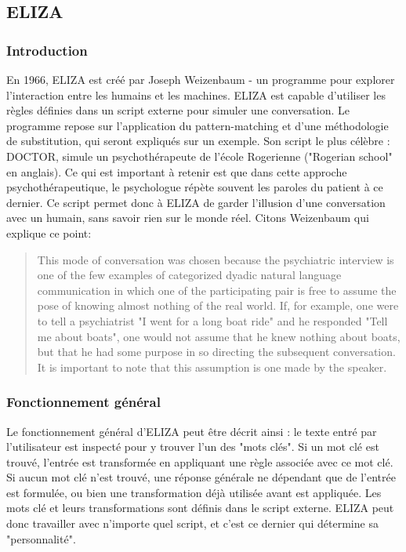 \documentclass[11pt, a4paper]{report}
\begin{document}
    \subsection{ELIZA}
    \cite{wikipedia-eliza}
    \cite{eliza-original}
    \cite{eliza-gpt}
    \cite{weizenbaum-book}
    \cite{weizenbaum-pic}
      \subsubsection{Introduction}
En 1966, ELIZA est créé par Joseph Weizenbaum - un programme pour explorer l'interaction entre les humains et 
les machines. ELIZA est capable d'utiliser les règles définies dans un script externe pour 
simuler une conversation. Le programme repose sur l'application du pattern-matching et d'une 
méthodologie de substitution, qui seront expliqués sur un exemple.
Son script le plus célèbre : DOCTOR, simule un psychothérapeute de l'école Rogerienne
("Rogerian school" en anglais). Ce qui est important à retenir est que dans cette approche 
psychothérapeutique, le psychologue répète souvent les paroles du patient à ce dernier. 
Ce script permet donc à ELIZA de garder l'illusion d'une conversation avec un humain, 
sans savoir rien sur le monde réel. Citons Weizenbaum qui explique ce point:

\begin{quote}
  This mode of conversation was chosen because the psychiatric interview is one of the 
  few examples of categorized dyadic natural 
  language communication in which one of the participating pair is free to assume the pose 
  of knowing almost nothing of the real world. If, for example, one were to tell a 
  psychiatrist "I went for a long boat ride" and he responded "Tell me about boats", 
  one would not assume that he knew nothing about boats, but that he had some purpose 
  in so directing the subsequent conversation. It is important to note that this 
  assumption is one made by the speaker. \cite[L'article original de Joseph Weizenbaum
  sur ELIZA]{eliza-original}
\end{quote} 

      \subsubsection{Fonctionnement général}
Le fonctionnement général d'ELIZA peut être décrit ainsi : le texte entré par l'utilisateur 
est inspecté pour y trouver l'un des "mots clés". Si un mot clé est trouvé, l'entrée est transformée 
en appliquant une règle associée avec ce mot clé. Si aucun mot clé n'est trouvé, une réponse générale 
ne dépendant que de l'entrée est formulée, ou bien une transformation déjà utilisée avant est appliquée. 
Les mots clé et leurs transformations sont définis dans le script externe. ELIZA peut donc travailler 
avec n'importe quel script, et c'est ce dernier qui détermine sa "personnalité". 
\end{document}
